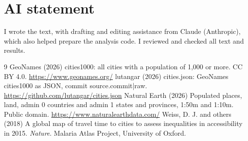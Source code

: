 \documentclass[11pt,a4paper]{article}
\begin{document}
\section*{AI statement}
I wrote the text, with drafting and editing assistance from Claude (Anthropic), which also helped prepare the analysis code. I reviewed and checked all text and results.

\begin{thebibliography}{9}
 GeoNames (2026) cities1000: all cities with a population of 1,000 or more. CC BY 4.0. \url{https://www.geonames.org/}
 lutangar (2026) cities.json: GeoNames cities1000 as JSON, commit {{source.commit|raw}}. \url{https://github.com/lutangar/cities.json}
 Natural Earth (2026) Populated places, land, admin 0 countries and admin 1 states and provinces, 1:50m and 1:10m. Public domain. \url{https://www.naturalearthdata.com/}
 Weiss, D. J. and others (2018) A global map of travel time to cities to assess inequalities in accessibility in 2015. \textit{Nature}. Malaria Atlas Project, University of Oxford.
\end{thebibliography}
\end{document}
